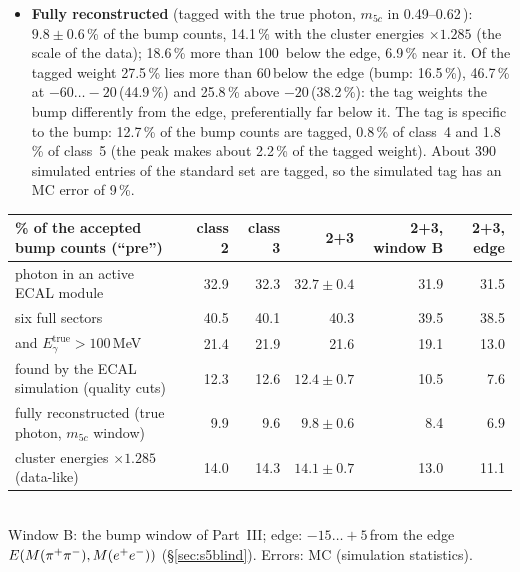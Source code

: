 {\begin{itemize}
      60\,MeV, 0.16 at 100--120\,MeV, 0.50 at 120--160\,MeV and 0.64--0.75 above. The simulated cluster energy is 7--9\,\% low
      (median $E_{\mathrm{cluster}}/E_{\mathrm{true}}$ 0.914 for all found photons, 0.931 with the cuts, from the cluster
      truth), so the 100\,MeV cut sits near 108\,MeV of true energy (in the data, near 85\,MeV: Part~II). The simulation
      always has a start-detector hit, so the START dependence of the photon $\beta$ cut seen in the data is absent.
\item \textbf{Fully reconstructed} (tagged with the true photon, $m_{5c}$ in 0.49--0.62\,\GeVcc): $9.8\pm0.6$\,\% of the
      bump counts, 14.1\,\% with the cluster energies $\times1.285$ (the scale of the data); 18.6\,\% more than 100\,\MeVcc
      below the edge, 6.9\,\% near it. Of the tagged weight 27.5\,\% lies more than 60\,\MeVcc below the edge (bump:
      16.5\,\%), 46.7\,\% at $-60\ldots-20$\,\MeVcc (44.9\,\%) and 25.8\,\% above $-20$\,\MeVcc (38.2\,\%): the tag weights the
      bump differently from the edge, preferentially far below it. The tag is specific to the bump: 12.7\,\% of the bump counts
      are tagged, 0.8\,\% of class~4 and 1.8\,\% of class~5 (the peak makes about 2.2\,\% of the tagged weight). About
      390 simulated entries of the standard set are tagged, so the simulated tag has an MC error of 9\,\%.
\end{itemize}
\begin{center}\footnotesize
\begin{tabular}{@{}l r r r r r@{}}
\toprule
\% of the accepted bump counts (``pre'') & class 2 & class 3 & 2+3 & 2+3, window B & 2+3, edge \\
\midrule
photon in an active ECAL module & 32.9 & 32.3 & $32.7\pm0.4$ & 31.9 & 31.5 \\
\quad six full sectors & 40.5 & 40.1 & 40.3 & 39.5 & 38.5 \\
\quad and $E_\gamma^{\mathrm{true}}>100$\,MeV & 21.4 & 21.9 & 21.6 & 19.1 & 13.0 \\
found by the ECAL simulation (quality cuts) & 12.3 & 12.6 & $12.4\pm0.7$ & 10.5 & 7.6 \\
fully reconstructed (true photon, $m_{5c}$ window) & 9.9 & 9.6 & $9.8\pm0.6$ & 8.4 & 6.9 \\
\quad cluster energies $\times1.285$ (data-like) & 14.0 & 14.3 & $14.1\pm0.7$ & 13.0 & 11.1 \\
\bottomrule
\end{tabular}\\[2pt]
{\footnotesize Window B: the bump window of Part~III; edge: $-15\ldots+5$\,\MeVcc from the edge $E(M(\pi^{+}\pi^{-}),M(e^{+}e^{-}))$
(\S\ref{sec:s5blind}). Errors: MC (simulation statistics).}
\end{center}}

